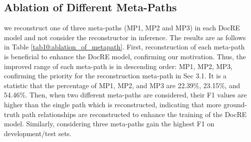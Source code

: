 \documentclass[letterpaper]{article} \usepackage{aaai21}  \usepackage{times}  \usepackage{helvet} \usepackage{courier}  \usepackage[hyphens]{url}  \usepackage{graphicx} \urlstyle{rm} \def\UrlFont{\rm}  \usepackage{natbib}  \usepackage{caption} \frenchspacing  \setlength{\pdfpagewidth}{8.5in}  \setlength{\pdfpageheight}{11in}  \usepackage{amsmath}
\begin{document}
\subsection{Ablation of Different Meta-Paths}
we reconstruct one of three meta-paths (MP1, MP2 and MP3) in each DocRE model and not consider the reconstructor in inference. 
The results are as follows in Table \ref{tab10:ablation_of_metapath}.
First, reconstruction of each meta-path is beneficial to enhance the DocRE model, confirming our motivation. 
Thus, the improved range of each meta-path is in descending order: MP1, MP2, MP3, confirming the priority for the reconstruction meta-path in Sec 3.1. 
It is a statistic that the percentage of MP1, MP2, and MP3 are 22.39\%, 23.15\%, and 54.46\%. 
Then, when two different meta-paths are considered, their F1 values are higher than the single path which is reconstructed, indicating that more ground-truth path relationships are reconstructed to enhance the training of the DocRE model. 
Similarly, considering three meta-paths gain the highest F1 on development/test sets.
\end{document}
